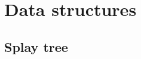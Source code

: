 \documentclass[a4paper]{article}
\begin{document}
  

  \section{Data structures}



  \subsection{Splay tree}
  \inputminted{cpp}{src/ds_splay_tree.cpp}




  
\end{document}
